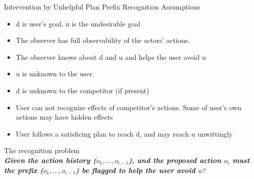 \begin{frame}{Intervention by Unhelpful Plan Prefix Recognition}
Assumptions
\begin{itemize}
\item $\mathrm{d}$ is user's goal, $\mathrm{u}$ is the  undesirable goal
\item The observer has full observability of the actors' actions.
\item The observer knows about $\mathrm{d}$  and $\mathrm{u}$ and helps the user avoid $\mathrm{u}$ 
\item $\mathrm{u}$  is unknown to the user. 
\item $\mathrm{d}$  is unknown to the competitor (if present)
\item User can not recognize effects of competitor's actions. Some of user's own actions may have hidden effects
\item User follows a satisficing plan to reach $\mathrm{d}$, and may reach $\mathrm{u}$  unwittingly
\end{itemize}
The recognition problem \\
\textit{\textbf{Given the action history ($o_1, \ldots ,o_{i-1}$), and the proposed action $o_i$ must the prefix ($o_1, \ldots ,o_{i-1}$) be flagged to help the user avoid $\mathrm{u}$}?}
\end{frame}